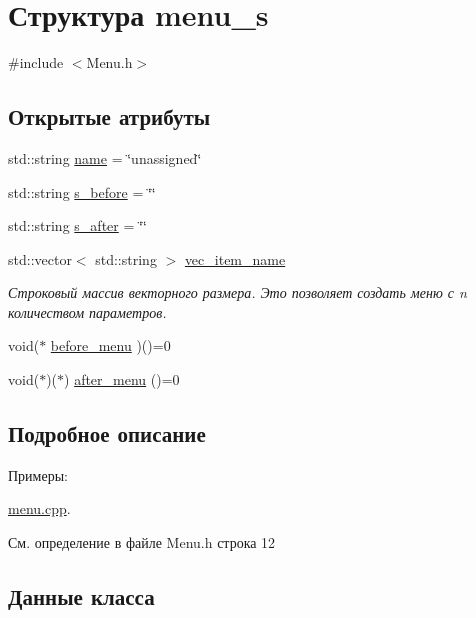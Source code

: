 \hypertarget{structmenu__s}{}\section{Структура menu\+\_\+s}
\label{structmenu__s}


{\ttfamily \#include $<$Menu.\+h$>$}

\subsection*{Открытые атрибуты}
\begin{DoxyCompactItemize}
\item 
std\+::string \hyperlink{structmenu__s_a2b4d6cd699b46daba2bb8297c11971aa}{name} = \char`\"{}unassigned\char`\"{}
\item 
std\+::string \hyperlink{structmenu__s_ad653d55a31d8503ad989ffd0b94c14e4}{s\+\_\+before} = \char`\"{}\char`\"{}
\item 
std\+::string \hyperlink{structmenu__s_a8622e3ccae9b1356ad3e2e3eb51a44e8}{s\+\_\+after} = \char`\"{}\char`\"{}
\item 
std\+::vector$<$ std\+::string $>$ \hyperlink{structmenu__s_abf8d2985fb3bf50d8e2075701149375a}{vec\+\_\+item\+\_\+name}
\begin{DoxyCompactList}\small\item\em Строковый массив векторного размера. Это позволяет создать меню с n количеством параметров. \end{DoxyCompactList}\item 
void($\ast$ \hyperlink{structmenu__s_aa71bffe8004873d1f43eeeb4e17595c8}{before\+\_\+menu} )()=0
\item 
void($\ast$)($\ast$) \hyperlink{structmenu__s_ad0e4cb85e66d3c8bc25687a92d986939}{after\+\_\+menu} ()=0
\end{DoxyCompactItemize}


\subsection{Подробное описание}
\begin{Desc}
\item[Примеры\+: ]\par
\hyperlink{menu_8cpp-example}{menu.\+cpp}.\end{Desc}


См. определение в файле Menu.\+h строка 12



\subsection{Данные класса}
\mbox{\label{structmenu__s_ad0e4cb85e66d3c8bc25687a92d986939}} 
